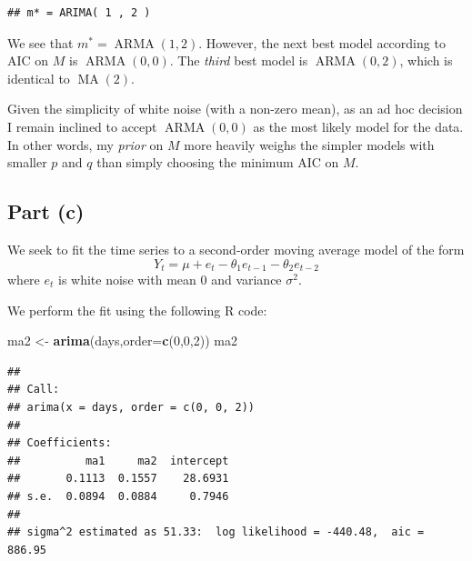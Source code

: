\documentclass[
]{article}
\newenvironment{Shaded}{\begin{snugshade}}{\end{snugshade}}
\newcommand{\AttributeTok}[1]{\textcolor[rgb]{0.13,0.29,0.53}{#1}}
\newcommand{\DecValTok}[1]{\textcolor[rgb]{0.00,0.00,0.81}{#1}}
\newcommand{\FunctionTok}[1]{\textcolor[rgb]{0.13,0.29,0.53}{\textbf{#1}}}
\newcommand{\NormalTok}[1]{#1}
\newcommand{\OtherTok}[1]{\textcolor[rgb]{0.56,0.35,0.01}{#1}}
\begin{document}
\begin{verbatim}
## m* = ARIMA( 1 , 2 )
\end{verbatim}

We see that \(m^* = \operatorname{ARMA}(1,2)\). However, the next best
model according to AIC on \(M\) is \(\operatorname{ARMA}(0,0)\). The
\emph{third} best model is \(\operatorname{ARMA}(0,2)\), which is
identical to \(\operatorname{MA}(2)\).

Given the simplicity of white noise (with a non-zero mean), as an ad hoc
decision I remain inclined to accept \(\operatorname{ARMA}(0,0)\) as the
most likely model for the data. In other words, my \emph{prior} on \(M\)
more heavily weighs the simpler models with smaller \(p\) and \(q\) than
simply choosing the minimum AIC on \(M\).

\hypertarget{part-c-3}{%
\subsection{Part (c)}\label{part-c-3}}


We seek to fit the time series to a second-order moving average model of
the form \[
   Y_t = \mu + e_t - \theta_1 e_{t-1} - \theta_2 e_{t-2}
\] where \(e_t\) is white noise with mean \(0\) and variance
\(\sigma^2\).

We perform the fit using the following R code:

\begin{Shaded}
\begin{Highlighting}[]
\NormalTok{ma2 }\OtherTok{\textless{}{-}} \FunctionTok{arima}\NormalTok{(days,}\AttributeTok{order=}\FunctionTok{c}\NormalTok{(}\DecValTok{0}\NormalTok{,}\DecValTok{0}\NormalTok{,}\DecValTok{2}\NormalTok{))}
\NormalTok{ma2}
\end{Highlighting}
\end{Shaded}

\begin{verbatim}
## 
## Call:
## arima(x = days, order = c(0, 0, 2))
## 
## Coefficients:
##          ma1     ma2  intercept
##       0.1113  0.1557    28.6931
## s.e.  0.0894  0.0884     0.7946
## 
## sigma^2 estimated as 51.33:  log likelihood = -440.48,  aic = 886.95
\end{verbatim}
\end{document}
